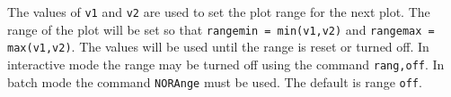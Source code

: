 \headb

The values of \texttt{v1} and \texttt{v2} are used to set the plot
range for the next plot.  The range of the plot will be set so that
\texttt{rangemin = min(v1,v2)} and \texttt{rangemax = max(v1,v2)}.
The values will be used until the range is reset or turned off.  In
interactive mode the range may be turned off using the command
\texttt{rang,off}.  In batch mode the command \texttt{NORAnge} must
be used.  The default is range \texttt{off}.
\vfill
\eject
